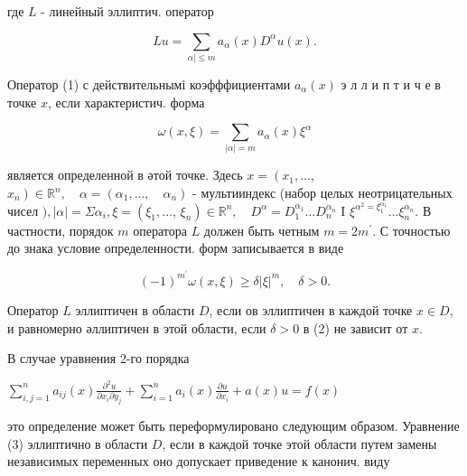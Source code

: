 \documentclass[10pt]{article}
\begin{document}
где $L$ - линейный эллиптич. оператор



\[

L u=\sum_{\alpha \mid \leqslant m} a_{\alpha}(x) D^{\alpha} u(x) .

\]



Оператор (1) с действительнымі коэфффициентами $a_{\alpha}(x)$ э л л и п т и ч е в точке $x$, если характеристич. форма



\[

\omega(x, \xi)=\sum_{|\alpha|=m} a_{\alpha}(x) \xi^{\alpha}

\]



является определенной в әтой точке. Здесь $x=\left(x_{1}, \ldots\right.$, $\left.x_{n}\right) \in \mathbb{R}^{n}, \quad \alpha=\left(\alpha_{1}, \ldots, \quad \alpha_{n}\right)$ - мультииндекс (набор целых неотрицательных чисел $),|\alpha|=\Sigma \alpha_{i}, \xi=\left(\xi_{1}, \ldots\right.$, $\left.\xi_{n}\right) \in \mathbb{R}^{n}, \quad D^{\alpha}=D_{1}^{\alpha_{1}} \ldots D_{n}^{\alpha_{n}}$ I $\xi^{\alpha^{2}=\xi_{1}^{\alpha_{1}}} \ldots \xi_{n}^{\alpha_{n}}$. В частности, порядок $m$ оператора $L$ должен быть четным $m=2 m^{\prime}$. С точностью до знака условие определенности. форм записывается в виде



\[

(-1)^{m^{\prime}} \omega(x, \xi) \geqslant \delta|\xi|^{m}, \quad \delta>0 .

\]



Оператор $L$ эллиптичен в области $D$, если ов эллиптичен в каждой точке $x \in D$, и равномерно әллиптичен в этой области, если $\delta>0$ в (2) не зависит от $x$.



В случае уравнения 2-го порядка



$\sum_{i, j=1}^{n} a_{i j}(x) \frac{\partial^{2} u}{\partial x_{i} \partial y_{j}}+\sum_{i=1}^{n} a_{i}(x) \frac{\partial u}{\partial x_{i}}+a(x) u=f(x)$



это определение может быть переформулировано следующим образом. Уравнение (3) эллиптично в области $D$, если в каждой точке этой области путем замены независимых переменных оно допускает приведение к канонич. виду
\end{document}
